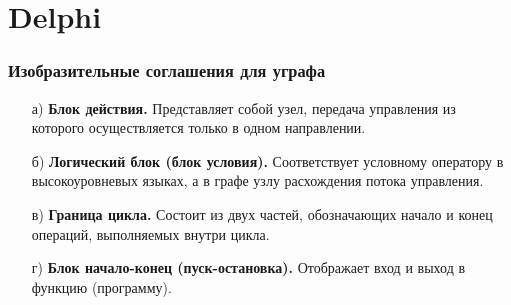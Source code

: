 \documentclass{beamer}
\begin{document}
\section{Delphi}
\begin{frame}
\frametitle{Изобразительные соглашения для уграфа}
\footnotesize{
	\begin{enumerate}
		\item[а)]
			\textbf{Блок действия.}  Представляет собой узел, передача управления из которого осуществляется только в одном направлении.
		\item[б)]
			\textbf{Логический блок (блок условия).} Соответствует условному оператору в высокоуровневых языках, а в графе узлу расхождения потока управления.
		\item[в)]
			\textbf{Граница цикла.} Состоит из двух частей, обозначающих начало и конец операций, выполняемых внутри цикла.
		\item[г)]
			\textbf{Блок начало-конец (пуск-остановка).} Отображает вход и выход в функцию (программу).
	\end{enumerate}
}
\begin{figure}[htbp]
	\begin{minipage}[b]{0.24\linewidth}
	\end{minipage}
\hfill
\begin{minipage}[b]{0.24\linewidth}
	\end{minipage}
\begin{minipage}[b]{0.24\linewidth}

\end{minipage}
\end{figure}
\end{frame}
\end{document}
